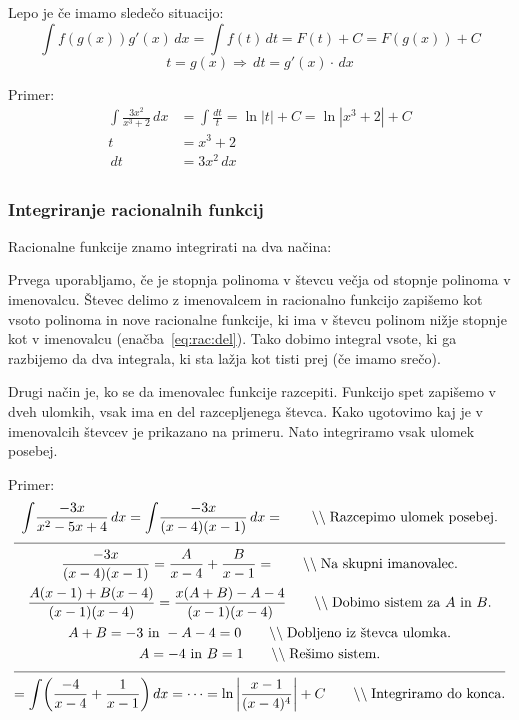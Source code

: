 \documentclass[a4paper,oneside,12pt,fleqn]{article}
\newcommand\krat\cdot
\newcommand{\comment}[1]{\ensuremath{\qquad\backslash\backslash\;}\textnormal{#1}}
\renewcommand{\d}{\ensuremath{\,d}} %
\newcommand{\dx}{\ensuremath{\d x}}
\newcommand{\dt}{\ensuremath{\d t}}
\renewcommand\implies\Rightarrow
\numberwithin{equation}{section}
\begin{document}
Lepo je če imamo sledečo situacijo:
\[ \int\!f(g(x))g'(x)\dx = \int\!f(t)\dt = F(t)+C = F(g(x)) + C \]
\[ t = g(x) \implies \dt = g'(x) \krat \dx \]

Primer:\\
\begin{align*}
  \int\!\frac{3x^2}{x^3+2}\dx &= \int\!\frac{dt}{t} = \ln|t| + C = \ln|x^3+2| + C \\
  t &= x^3+2 \\
  \dt &= 3x^2 \dx \\
\end{align*}

\subsubsection{Integriranje racionalnih funkcij}
\label{sec:int:rac}
Racionalne funkcije znamo integrirati na dva načina:

Prvega uporabljamo, če je stopnja polinoma v števcu večja od stopnje polinoma v
imenovalcu. Števec delimo z imenovalcem in racionalno funkcijo zapišemo kot
vsoto polinoma in nove racionalne funkcije, ki ima v števcu polinom nižje stopnje kot v
imenovalcu (enačba~\eqref{eq:rac:del}). Tako dobimo integral vsote, ki ga razbijemo da dva
integrala, ki sta lažja kot tisti prej (če imamo srečo).

Drugi način je, ko se da imenovalec funkcije razcepiti. Funkcijo spet zapišemo v dveh
ulomkih, vsak ima en del razcepljenega števca. Kako ugotovimo kaj je v imenovalcih števcev
je prikazano na primeru. Nato integriramo vsak ulomek posebej.

Primer:
\begin{gather*}
  \int\!\frac{-3x}{x^2-5x+4}\dx = \int\!\frac{-3x}{(x-4)(x-1)}\dx = \comment{Razcepimo
  ulomek posebej.} \\[6pt] \hline \\[-12pt]
  \frac{-3x}{(x-4)(x-1)} = \frac{A}{x-4} + \frac{B}{x-1} = \comment{Na skupni imanovalec.}  \\
  \frac{A(x-1)+B(x-4)}{(x-1)(x-4)} = \frac{x(A+B) - A - 4}{(x-1)(x-4)} \comment{Dobimo
  sistem za $A$ in $B$.} \\
  A + B = -3 \text{ in } -A - 4 = 0 \comment{Dobljeno iz števca ulomka.} \\
  A = -4 \text{ in } B = 1 \comment{Rešimo sistem.} \\[6pt] \hline \\[-12pt]
  = \int\!\left(\frac{-4}{x-4}+\frac{1}{x-1}\right)\!\dx = \cdots =
  \ln\left|\frac{x-1}{(x-4)^4}\right|+C \comment{Integriramo do konca.}
\end{gather*}
\end{document}
